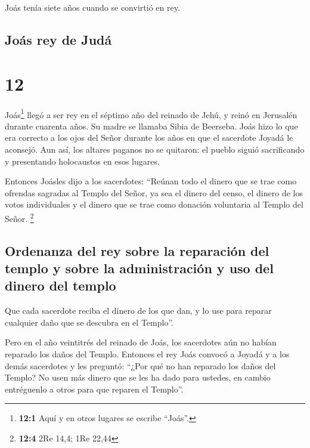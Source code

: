  Joás tenía siete años cuando se convirtió en rey.

\hypertarget{jouxe1s-rey-de-juduxe1}{%
\subsection{Joás rey de Judá}\label{jouxe1s-rey-de-juduxe1}}

\hypertarget{section-11}{%
\section{12}\label{section-11}}

 Joás\footnote{\textbf{12:1} Aquí y en otros lugares se
  escribe ``Joás''.} llegó a ser rey en el séptimo año del reinado de
Jehú, y reinó en Jerusalén durante cuarenta años. Su madre se llamaba
Sibia de Beerseba.  Joás hizo lo que era correcto a los
ojos del Señor durante los años en que el sacerdote Joyadá le aconsejó.
 Aun así, los altares paganos no se quitaron: el pueblo
siguió sacrificando y presentando holocaustos en esos lugares.

 Entonces Joásles dijo a los sacerdotes: ``Reúnan todo el
dinero que se trae como ofrendas sagradas al Templo del Señor, ya sea el
dinero del censo, el dinero de los votos individuales y el dinero que se
trae como donación voluntaria al Templo del Señor. \footnote{\textbf{12:4}
  2Re 14,4; 1Re 22,44}

\hypertarget{ordenanza-del-rey-sobre-la-reparaciuxf3n-del-templo-y-sobre-la-administraciuxf3n-y-uso-del-dinero-del-templo}{%
\subsection{Ordenanza del rey sobre la reparación del templo y sobre la
administración y uso del dinero del
templo}\label{ordenanza-del-rey-sobre-la-reparaciuxf3n-del-templo-y-sobre-la-administraciuxf3n-y-uso-del-dinero-del-templo}}

 Que cada sacerdote reciba el dinero de los que dan, y lo
use para reparar cualquier daño que se descubra en el Templo''.

 Pero en el año veintitrés del reinado de Joás, los
sacerdotes aún no habían reparado los daños del Templo. 
Entonces el rey Joás convocó a Joyadá y a los demás sacerdotes y les
preguntó: ``¿Por qué no han reparado los daños del Templo? No usen más
dinero que se les ha dado para ustedes, en cambio entréguenlo a otros
para que reparen el Templo''.

